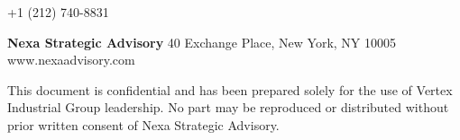 {\begin{frame}[plain]
\begin{minipage}{0.84\paperwidth}
\begin{minipage}[t]{0.44\textwidth}
      \textcolor{NexaGray}{\scriptsize
        \faPhone\; +1 (212) 740-8831}
    \end{minipage}
    \vspace{0.7cm}\par
    \textcolor{NexaGray}{\scriptsize
      \textbf{Nexa Strategic Advisory} \textbar{}
      40 Exchange Place, New York, NY 10005 \textbar{}
      www.nexaadvisory.com}\par
    \vspace{0.2cm}
    \textcolor{NexaGray!60}{\scriptsize
      This document is confidential and has been prepared solely
      for the use of Vertex Industrial Group leadership. No part
      may be reproduced or distributed without prior written
      consent of Nexa Strategic Advisory.}
  \end{minipage}
\end{frame}
}
